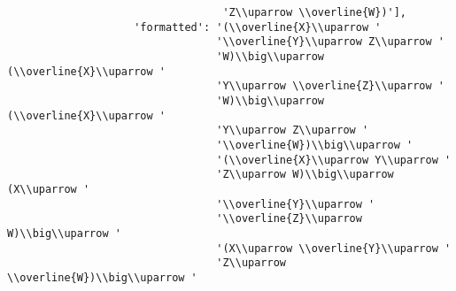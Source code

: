 \begin{verbatim}
                                  'Z\\uparrow \\overline{W})'],
                    'formatted': '(\\overline{X}\\uparrow '
                                 '\\overline{Y}\\uparrow Z\\uparrow '
                                 'W)\\big\\uparrow (\\overline{X}\\uparrow '
                                 'Y\\uparrow \\overline{Z}\\uparrow '
                                 'W)\\big\\uparrow (\\overline{X}\\uparrow '
                                 'Y\\uparrow Z\\uparrow '
                                 '\\overline{W})\\big\\uparrow '
                                 '(\\overline{X}\\uparrow Y\\uparrow '
                                 'Z\\uparrow W)\\big\\uparrow (X\\uparrow '
                                 '\\overline{Y}\\uparrow '
                                 '\\overline{Z}\\uparrow W)\\big\\uparrow '
                                 '(X\\uparrow \\overline{Y}\\uparrow '
                                 'Z\\uparrow \\overline{W})\\big\\uparrow '

\end{verbatim}
